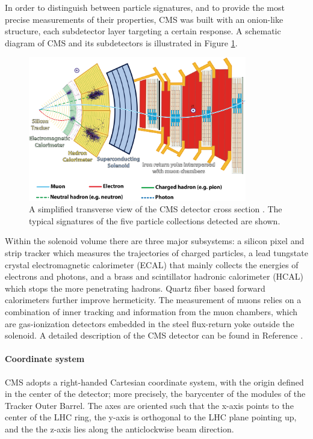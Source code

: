 In order to distinguish between particle signatures, and to provide the most precise measurements of their properties, CMS was built with an onion-like structure, each subdetector layer targeting a certain response.
A schematic diagram of CMS and its subdetectors is illustrated in Figure \ref{fig:CMSslice}.

\begin{figure}[htb]
\begin{center}
\includegraphics[width=0.85\textwidth]{Figures/CMSslice_whiteBackground.png}
\end{center}
\caption{A simplified transverse view of the CMS detector cross section \cite{CMS-PHO-GEN-2016-001}. The typical signatures of the five particle collections detected are shown.}
\label{fig:CMSslice}
\end{figure}

Within the solenoid volume there are three major subsystems:
a silicon pixel and strip tracker which measures the trajectories of charged particles,
a lead tungstate crystal electromagnetic calorimeter (ECAL) that mainly collects the energies of electrons and photons,
and a brass and scintillator hadronic calorimeter (HCAL) which stops the more penetrating hadrons.
Quartz fiber based forward calorimeters further improve hermeticity.
The measurement of muons relies on a combination of inner tracking and information from the muon chambers,
which are gas-ionization detectors embedded in the steel flux-return yoke outside the solenoid.
A detailed description of the CMS detector can be found in Reference \cite{CMS:2008}.

\paragraph{Coordinate system\\}
CMS adopts a right-handed Cartesian coordinate system, with the origin defined in the center of the detector; more precisely, the barycenter of the modules of the Tracker Outer Barrel.
The axes are oriented such that the x-axis points to the center of the LHC ring, the y-axis is orthogonal to the LHC plane pointing up, and the the z-axis lies along the anticlockwise beam direction.

